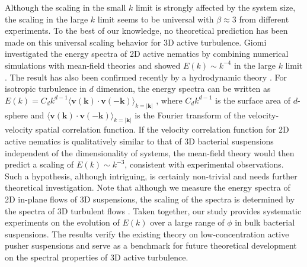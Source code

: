 \documentclass[twocolumn,aps,prx,amsmath,amssymb,longbibliography]{revtex4-2}
\begin{document}
Although the scaling in the small $k$ limit is strongly affected by the system size, the scaling in the large $k$ limit seems to be universal with $\beta \approx 3$ from different experiments. To the best of our knowledge, no theoretical prediction has been made on this universal scaling behavior for 3D active turbulence. Giomi investigated the energy spectra of 2D active nematics by combining numerical simulations with mean-field theories and showed $E(k) \sim k^{-4}$ in the large $k$ limit \cite{Giomi2015}.
The result has also been confirmed recently by a hydrodynamic theory \cite{Alert2020}. For isotropic turbulence in $d$ dimension, the energy spectra can be written as $E(k) = C_d k^{d-1} \langle \mathbf{v}(\mathbf{k})\cdot \mathbf{v}(-\mathbf{k})\rangle_{k = |\mathbf{k}|}$ \cite{Wensink2012,Bardfalvy2019},
where $C_d k^{d-1}$ is the surface area of $d$-sphere and $\langle \mathbf{v}(\mathbf{k})\cdot \mathbf{v}(-\mathbf{k})\rangle_{k = |\mathbf{k}|}$ is the Fourier transform of the velocity-velocity spatial correlation function. If the velocity correlation function for 2D active nematics is qualitatively similar to that of 3D bacterial suspensions independent of the dimensionality of systems, the mean-field theory would then predict a scaling of $E(k) \sim k^{-3}$, consistent with experimental observations. Such a hypothesis, although intriguing, is certainly non-trivial and needs further theoretical investigation. Note that although we measure the energy spectra of 2D in-plane flows of 3D suspensions, the scaling of the spectra is determined by the spectra of 3D turbulent flows \cite{Pope2000}. Taken together, our study provides systematic experiments on the evolution of $E(k)$ over a large range of $\phi$ in bulk bacterial suspensions. The results verify the existing theory on low-concentration active pusher suspensions and serve as a benchmark for future theoretical development on the spectral properties of 3D active turbulence.
\end{document}
